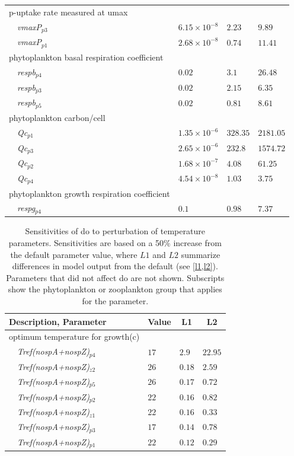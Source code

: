 \documentclass[letterpaper,12pt,oneside]{article}\usepackage[]{graphicx}\usepackage[]{color}
\begin{document}
\begin{table}[!tbp]
{\begin{center}
\begin{tabular}{llll}
\hline
{p-uptake rate measured at umax}&&&\tabularnewline
~~\textit{vmaxP$_{p3}$}&$6.15\times 10^{-8}$&$2.23$&$9.89$\tabularnewline
~~\textit{vmaxP$_{p1}$}&$2.68\times 10^{-8}$&$0.74$&$11.41$\tabularnewline
\hline
{phytoplankton basal respiration coefficient}&&&\tabularnewline
~~\textit{respb$_{p4}$}&$0.02$&$3.1$&$26.48$\tabularnewline
~~\textit{respb$_{p3}$}&$0.02$&$2.15$&$6.35$\tabularnewline
~~\textit{respb$_{p5}$}&$0.02$&$0.81$&$8.61$\tabularnewline
\hline
{phytoplankton carbon/cell}&&&\tabularnewline
~~\textit{Qc$_{p1}$}&$1.35\times 10^{-6}$&$328.35$&$2181.05$\tabularnewline
~~\textit{Qc$_{p3}$}&$2.65\times 10^{-6}$&$232.8$&$1574.72$\tabularnewline
~~\textit{Qc$_{p2}$}&$1.68\times 10^{-7}$&$4.08$&$61.25$\tabularnewline
~~\textit{Qc$_{p4}$}&$4.54\times 10^{-8}$&$1.03$&$3.75$\tabularnewline
\hline
{phytoplankton growth respiration coefficient}&&&\tabularnewline
~~\textit{respg$_{p4}$}&$0.1$&$0.98$&$7.37$\tabularnewline
\hline
\end{tabular}\end{center}}

\end{table}


\begin{table}[!tbp]
{\normalsize
\caption{Sensitivities of \ac{do} to perturbation of temperature parameters.  Sensitivities are based on a 50\% increase from the default parameter value, where $L1$ and $L2$ summarize differences in model output from the default (see \cref{l1,l2}).  Parameters that did not affect \ac{do} are not shown.  Subscripts show the phytoplankton or zooplankton group that applies for the parameter.\label{tab:tempsens}} 
\begin{center}
\begin{tabular}{llll}
\hline\hline
\multicolumn{1}{l}{Description, Parameter}&\multicolumn{1}{c}{Value}&\multicolumn{1}{c}{L1}&\multicolumn{1}{c}{L2}\tabularnewline
\hline
{optimum temperature for growth(c)}&&&\tabularnewline
~~\textit{Tref(nospA+nospZ)$_{p4}$}&$17$&$2.9$&$22.95$\tabularnewline
~~\textit{Tref(nospA+nospZ)$_{z2}$}&$26$&$0.18$&$2.59$\tabularnewline
~~\textit{Tref(nospA+nospZ)$_{p5}$}&$26$&$0.17$&$0.72$\tabularnewline
~~\textit{Tref(nospA+nospZ)$_{p2}$}&$22$&$0.16$&$0.82$\tabularnewline
~~\textit{Tref(nospA+nospZ)$_{z1}$}&$22$&$0.16$&$0.33$\tabularnewline
~~\textit{Tref(nospA+nospZ)$_{p3}$}&$17$&$0.14$&$0.78$\tabularnewline
~~\textit{Tref(nospA+nospZ)$_{p1}$}&$22$&$0.12$&$0.29$\tabularnewline
\hline
\end{tabular}\end{center}}

\end{table}
\end{document}
